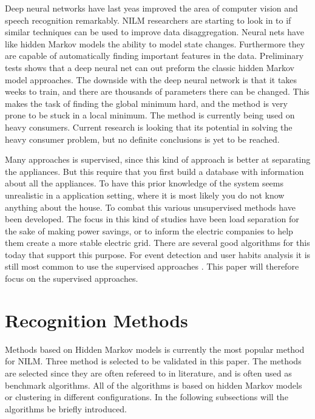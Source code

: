 Deep neural networks have last yeas improved the area of computer vision and speech recognition remarkably. NILM researchers are starting to look in to if similar techniques can be used to improve data disaggregation. Neural nets have like hidden Markov models the ability to model state changes. Furthermore they are capable of automatically finding important features in the data. Preliminary tests shows that a deep neural net can out preform the classic hidden Markov model approaches. The downside with the deep neural network is that it takes weeks to train, and there are thousands of parameters there can be changed. This makes the task of finding the global minimum hard, and the method is very prone to be stuck in a local minimum. The method is currently being used on heavy consumers\citep{RefWorks:25}. Current research is looking that its potential in solving the heavy consumer problem, but no definite conclusions is yet to be reached. 

Many approaches is supervised, since this kind of approach is better at separating the appliances. But this require that you first build a database with information about all the appliances. To have this prior knowledge of the system seems unrealistic in a application setting, where it is most likely you do not know anything about the house. To combat this various unsupervised methods have been developed. The focus in this kind of studies have been load separation for the sake of making power savings, or to inform the electric companies to help them create a more stable electric grid. There are several good algorithms for this today that support this purpose. For event detection and user habits analysis it is still most common to use the supervised approaches \citep{RefWorks:19}. This paper will therefore focus on the supervised approaches. 

\newpage
			

\section{Recognition Methods}
\label{RecognitionMethods}
Methods based on Hidden Markov models is currently the most popular method for NILM. Three method is selected to be validated in this paper. The methods are selected since they are often refereed to in literature, and is often used as benchmark algorithms. All of the algorithms is based on hidden Markov models or clustering in different configurations. In the following subsections will the algorithms be briefly introduced. 

